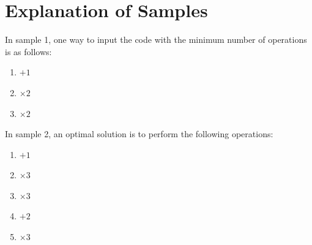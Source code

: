 \section*{Explanation of Samples}
In sample 1, one way to input the code with the minimum number of operations is as follows:
\begin{enumerate}
  \item $+1$
  \item $\times 2$
  \item $\times 2$
\end{enumerate}

In sample 2, an optimal solution is to perform the following operations:
\begin{enumerate}
  \item $+1$
  \item $\times 3$
  \item $\times 3$
  \item $+2$
  \item $\times 3$
\end{enumerate}
